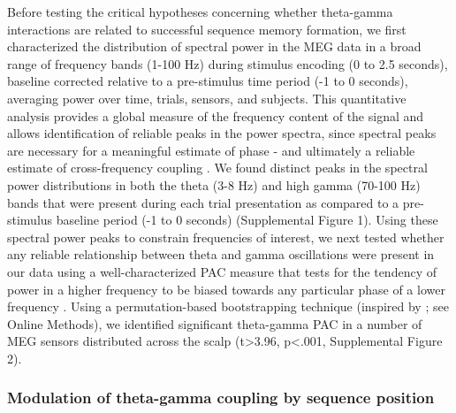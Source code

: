Before testing the critical hypotheses concerning whether theta-gamma
interactions are related to successful sequence memory formation, we
first characterized the distribution of spectral power in the MEG data
in a broad range of frequency bands (1-100 Hz) during stimulus encoding
(0 to 2.5 seconds), baseline corrected relative to a pre-stimulus time
period (-1 to 0 seconds), averaging power over time, trials, sensors,
and subjects. This quantitative analysis provides a global measure of
the frequency content of the signal and allows identification of
reliable peaks in the power spectra, since spectral peaks are necessary
for a meaningful estimate of phase - and ultimately a reliable estimate
of cross-frequency coupling \autocite{aru_untangling_2015}. We found
distinct peaks in the spectral power distributions in both the theta
(3-8 Hz) and high gamma (70-100 Hz) bands that were present during each
trial presentation as compared to a pre-stimulus baseline period (-1 to
0 seconds) (Supplemental Figure 1). Using these spectral power peaks to
constrain frequencies of interest, we next tested whether any reliable
relationship between theta and gamma oscillations were present in our
data using a well-characterized PAC measure that tests for the tendency
of power in a higher frequency to be biased towards any particular phase
of a lower frequency
\autocites{tort_measuring_2010}{tort_thetagamma_2009}. Using a
permutation-based bootstrapping technique (inspired by
\textcite{canolty_high_2006}; see Online Methods), we identified
significant theta-gamma PAC in a number of MEG sensors distributed
across the scalp (t\textgreater{}3.96, p\textless{}.001, Supplemental
Figure 2).

\subsubsection{Modulation of theta-gamma coupling by sequence
position}\label{modulation-of-theta-gamma-coupling-by-sequence-position}

